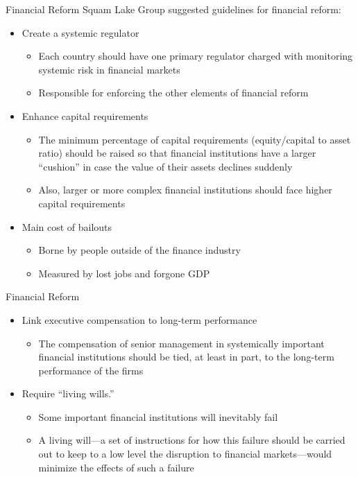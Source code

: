 \documentclass[aspectratio=1610]{beamer}
\begin{document}
\begin{frame}[wide]{Financial Reform}
	Squam Lake Group suggested guidelines for financial reform:
	\begin{itemize}
		\item Create a systemic regulator
		\begin{itemize}
			\item Each country should have one primary regulator charged with monitoring systemic risk in financial markets
			\item Responsible for enforcing the other elements of financial reform
		\end{itemize}
		\item Enhance capital requirements
		\begin{itemize}
			\item The minimum percentage of capital requirements (equity/capital to asset ratio) should be raised so that financial institutions have a larger “cushion” in case the value of their assets declines suddenly
			\item Also, larger or more complex financial institutions should face higher capital requirements
		\end{itemize}
		\item Main cost of bailouts
		\begin{itemize}
			\item Borne by people outside of the finance industry
			\item Measured by lost jobs and forgone GDP
		\end{itemize}
	\end{itemize}
\end{frame}

\begin{frame}[wide]{Financial Reform}
	\begin{itemize}
		\item Link executive compensation to long-term performance
		\begin{itemize}
			\item The compensation of senior management in systemically important financial institutions should be tied, at least in part, to the long-term performance of the firms
		\end{itemize}
		\item Require “living wills.” 
		\begin{itemize}
			\item Some important financial institutions will inevitably fail
			\item A living will—a set of instructions for how this failure should be carried out to keep to a low level the disruption to financial markets—would minimize the effects of such a failure
		\end{itemize}
	\end{itemize}
\end{frame}
\end{document}
